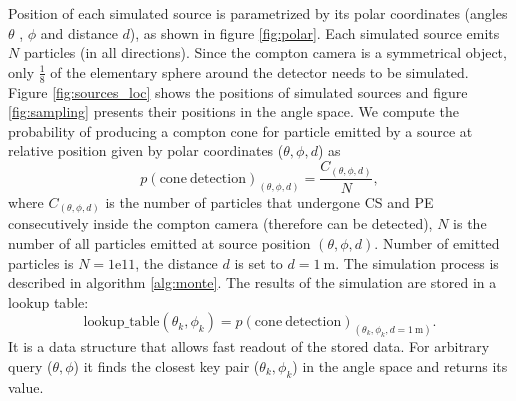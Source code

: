 
Position of each simulated source is parametrized by its polar coordinates (angles $\theta$ , $\phi$ and distance $d$), as shown in figure \ref{fig:polar}.
Each simulated source emits $N$ particles (in all directions).
Since the compton camera is a symmetrical object, only $\frac{1}{8}$ of the elementary sphere around the detector needs to be simulated.
Figure \ref{fig:sources_loc} shows the positions of simulated sources and figure \ref{fig:sampling} presents their positions in the angle space.
We compute the probability of producing a compton cone for particle emitted by a source at relative position given by polar coordinates ($\theta, \phi, d$) as
\begin{equation}
  p(\mathrm{cone\ detection})_{(\theta, \phi, d)} = \frac{C_{(\theta, \phi, d)}}{N},
\end{equation} 
where $C_{(\theta, \phi, d)}$ is the number of particles that undergone \ac{CS} and \ac{PE} consecutively inside the compton camera (therefore can be detected), $N$ is the number of all particles emitted at source position $(\theta, \phi, d)$. 
Number of emitted particles is $N = 1\mathrm{e}11$, the distance $d$ is set to $d = \SI{1}\meter$.
The simulation process is described in algorithm \ref{alg:monte}. 
The results of the simulation are stored in a lookup table:
\begin{equation}
  \mathrm{lookup\_table}(\theta_{k}, \phi_{k}) = p(\mathrm{cone\ detection})_{(\theta_{k}, \phi_{k}, d = \SI{1}\meter)}. 
\end{equation}
It is a data structure that allows fast readout of the stored data.
For arbitrary query ($\theta, \phi$) it finds the closest key pair ($\theta_{k}, \phi_{k}$) in the angle space and returns its value.

